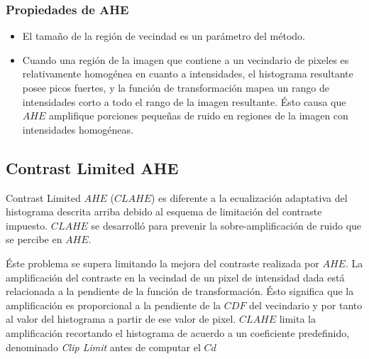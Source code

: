 \subsubsection{Propiedades de AHE}

\begin{itemize}
    \item El tamaño de la región de vecindad es un parámetro del método. 
    \item Cuando una región de la imagen que contiene a un vecindario de pixeles es relativamente homogénea en cuanto a intensidades, el histograma resultante posee picos fuertes, y la función de transformación mapea un rango de intensidades corto a todo el rango de la imagen resultante. Ésto causa que $AHE$ amplifique porciones pequeñas de ruido en regiones de la imagen con intensidades homogéneas.
\end{itemize}

\subsection{Contrast Limited AHE}

Contrast Limited $AHE$ ($CLAHE$) es diferente a la ecualización adaptativa del histograma descrita arriba debido al esquema de limitación del contraste impuesto. $CLAHE$ se desarrolló para prevenir la sobre-amplificación de ruido que se percibe en $AHE$.

Éste problema se supera limitando la mejora del contraste realizada por $AHE$. La amplificación del contraste en la vecindad de un pixel de intensidad dada está relacionada a la pendiente de la función de transformación. Ésto significa que la amplificación es proporcional a la pendiente de la $CDF$ del vecindario y por tanto al valor del histograma a partir de ese valor de pixel. $CLAHE$ limita la amplificación recortando el histograma de acuerdo a un coeficiente predefinido, denominado \textit{Clip Limit} antes de computar el $C$$d$



